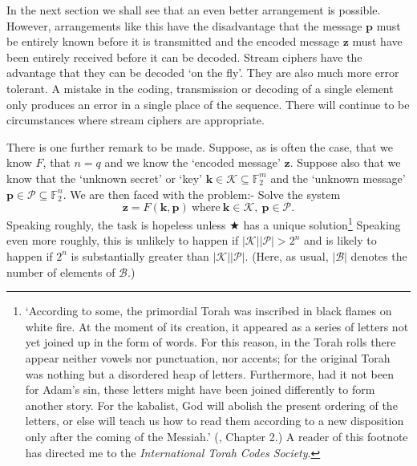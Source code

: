 In the next section we shall see that an even
better arrangement is possible. However, arrangements
like this have the disadvantage that
the message ${\mathbf p}$ must be entirely known
before it is transmitted  and the encoded
message ${\mathbf z}$ must have been entirely
received before it can be decoded. Stream ciphers
have the advantage that they can be decoded
`on the fly'. They are also much more error
tolerant. A mistake in the coding, transmission
or decoding of a single element only produces
an error in a single place of the sequence.
There will continue to be circumstances
where stream ciphers are appropriate.

There is one further remark to be made.
Suppose, as is often the case, that
we know $F$, that $n=q$
and we know the `encoded message'
${\mathbf z}$. Suppose also
that we know that the `unknown secret' or `key'
${\mathbf k}\in \mathcal{K}\subseteq {\mathbb F}_{2}^{m}$
and the
`unknown message' 
${\mathbf p}\in \mathcal{P}\subseteq {\mathbb F}_{2}^{n}$.
We are then faced with the problem:-
Solve the system
\begin{equation*}
{\mathbf z}=F({\mathbf k},{\mathbf p})
\ \text{where}\ {\mathbf k}\in \mathcal{K},
\  {\mathbf p}\in \mathcal{P}. \tag*{$\bigstar$}
\end{equation*}
Speaking roughly, the task is
hopeless unless $\bigstar$ has a unique
solution\footnote{`According to some, the primordial
Torah was inscribed in black flames on white fire.
At the moment of its creation, it appeared as a series
of letters not yet joined up in the form of words.
For this reason, in the Torah rolls there appear neither
vowels nor punctuation, nor accents; for the original
Torah was nothing but a disordered heap of letters.
Furthermore, had it not been for Adam's sin, these letters
might have been joined differently to form
another story. For the kabalist, God will abolish the
present ordering of the letters, or else will teach us
how to read them according to a new disposition
only after the coming of the Messiah.' (\cite{Eco}, Chapter 2.)
A reader of this footnote has directed me to the 
\emph{International Torah Codes Society}.}
Speaking even more roughly, this is unlikely to happen
if $|\mathcal{K}||\mathcal{P}|>2^{n}$ and is
likely to happen if $2^{n}$ is substantially
greater than $|\mathcal{K}||\mathcal{P}|$.
(Here, as usual, $|\mathcal{B}|$
denotes the number of elements of $\mathcal{B}$.)


